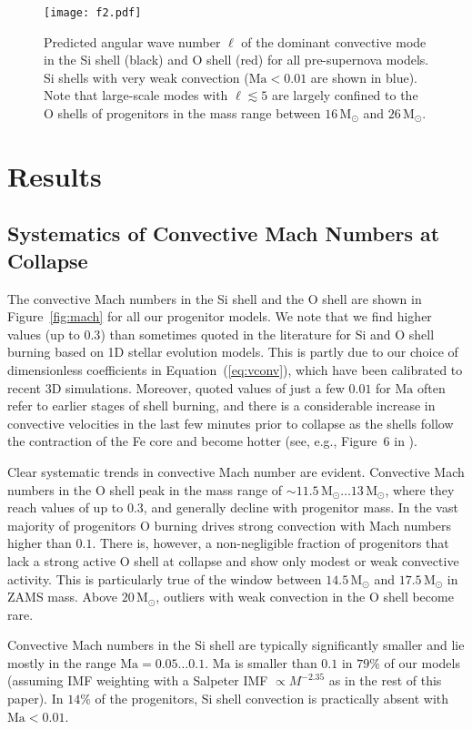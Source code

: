 \documentclass[useAMS,usenatbib]{mnras}
\newcommand{\Msun}{\ensuremath{\mathrm{M}_\odot}}
\begin{document}
\begin{figure}
\texttt{[image: f2.pdf]}
\caption{Predicted angular wave number $\ell$ of the dominant convective mode
in the Si shell (black) and
O shell (red) for all pre-supernova
models. Si shells with 
very weak convection
($\mathrm{Ma}<0.01$ are shown in blue). Note that large-scale
modes with $\ell\lesssim 5$ are largely
confined to the O shells of progenitors in the
mass range between $16 \,\Msun$
and $26 \,\Msun$.
\label{fig:ang}}
\end{figure}

\section{Results}
\label{sec:results}

\subsection{Systematics of Convective Mach Numbers
at Collapse} The convective Mach numbers in the Si shell
and the O shell are shown in Figure~\ref{fig:mach} for all our
progenitor models. We note that we find higher values
(up to $0.3$) than
sometimes quoted in the literature for Si and O shell burning based
on 1D stellar evolution models. This is partly
due to our choice of dimensionless coefficients in
Equation~(\ref{eq:vconv}), which have been calibrated
to recent 3D simulations. Moreover, quoted values
of just a few $0.01$ for $\mathrm{Ma}$ often refer
to earlier stages of shell burning, and there is
a considerable increase in convective velocities
in the last few minutes prior to collapse as the
shells follow the contraction of the Fe core and become
hotter (see, e.g., Figure~6 in \citealt{mueller_16c}).

Clear systematic trends in convective Mach number are evident.
Convective Mach numbers in the O shell peak in the
mass range of $\mathord{\sim} 11.5\,\Msun\ldots 13\,\Msun$, where they
reach values of up to $0.3$, and generally decline with progenitor
mass. In the vast majority of progenitors O burning drives strong
convection with Mach numbers higher than $0.1$. There is, however, a
non-negligible fraction of progenitors that lack a strong active O shell
at collapse and show only modest or weak convective activity.  This is
particularly true of the window between $14.5 \,\Msun$ and $17.5
  \,\Msun$ in ZAMS mass. Above $20 \,\Msun$, outliers with weak convection in
the O shell become rare.


Convective Mach numbers in the Si shell are typically significantly smaller and lie mostly in the range $\mathrm{Ma}=0.05\ldots 0.1$.  $\mathrm{Ma}$ is smaller than $0.1$ in $79\%$ of our models (assuming IMF weighting with a Salpeter IMF $\propto M^{-2.35}$ as in the rest of this paper).  In $14\%$ of the progenitors,  Si shell convection is practically absent with $\mathrm{Ma}<0.01$.
\end{document}
